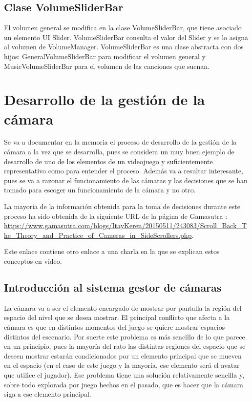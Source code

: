 \subsection{Clase VolumeSliderBar}
El volumen general se modifica en la clase VolumeSliderBar, que tiene asociado un elemento UI Slider. VolumeSliderBar consulta el valor del Slider y se lo asigna al volumen de VolumeManager. VolumeSliderBar es una clase abstracta con dos hijos: GeneralVolumeSliderBar para modificar el volumen general y MusicVolumeSliderBar para el volumen de las canciones que suenan.

\section{Desarrollo de la gestión de la cámara}
Se va a documentar en la memoria el proceso de desarrollo de la gestión de la cámara a la vez que se desarrolla, pues se considera un muy buen ejemplo de desarrollo de uno de los elementos de un videojuego y suficientemente representativo como para entender el proceso. Además va a resultar interesante, pues se va a razonar el funcionamiento de las cámaras y las decisiones que se han tomado para escoger un funcionamiento de la cámara y no otro.

La mayoría de la información obtenida para la toma de decisiones durante este proceso ha sido obtenida de la siguiente URL de la página de Gamasutra \cite{Gamasutra}:\\
 \url{https://www.gamasutra.com/blogs/ItayKeren/20150511/243083/Scroll_Back_The_Theory_and_Practice_of_Cameras_in_SideScrollers.php}.
 
Este enlace contiene otro enlace a una charla en la que se explican estos conceptos en video.

\subsection{Introducción al sistema gestor de cámaras}
La cámara va a ser el elemento encargado de mostrar por pantalla la región del espacio del nivel que se desea mostrar. El principal conflicto que afecta a la cámara es que en distintos momentos del juego se quiere mostrar espacios distintos del escenario. Por suerte este problema es más sencillo de lo que parece en un principio, pues la mayoría del rato las distintas regiones del espacio que se deseen mostrar estarán condicionados por un elemento principal que se mueven en el espacio (en el caso de este juego y la mayoría, ese elemento será el avatar que utilice el jugador). Ese problema tiene una solución relativamente sencilla y, sobre todo explorada por juego hechos en el pasado, que es hacer que la cámara siga a ese elemento principal.

